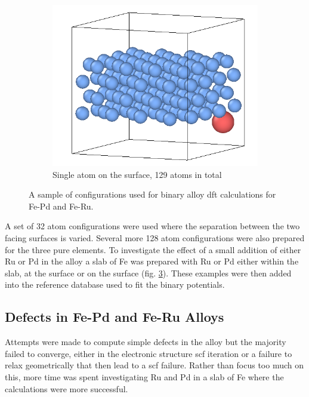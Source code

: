 \begin{figure}[htb]
\begin{subfigure}{.32\textwidth}
  \label{fig:sub-first}
\end{subfigure}
\begin{subfigure}{.32\textwidth}
  \centering
  \includegraphics[width=.94\linewidth]{chapters/potentials_fe_pd_ru/slabs/slab03.png}  
  \caption{Single atom on the surface, 129 atoms in total}
  \label{fig:sub-first}
\end{subfigure}
\caption{A sample of configurations used for binary alloy \acrshort{dft} calculations for Fe-Pd and Fe-Ru.}
\label{fig:binaryalloyconfigurationsslab}
\end{figure}

A set of 32 atom configurations were used where the separation between the two facing surfaces is varied.  Several more 128 atom configurations were also prepared for the three pure elements.  To investigate the effect of a small addition of either Ru or Pd in the alloy a slab of Fe was prepared with Ru or Pd either within the slab, at the surface or on the surface (fig. \ref{fig:binaryalloyconfigurationsslab}).  These examples were then added into the reference database used to fit the binary potentials.



\FloatBarrier
\subsection{Defects in Fe-Pd and Fe-Ru Alloys}

Attempts were made to compute simple defects in the alloy but the majority failed to converge, either in the electronic structure \acrshort{scf} iteration or a failure to relax geometrically that then lead to a \acrshort{scf} failure.  Rather than focus too much on this, more time was spent investigating Ru and Pd in a slab of Fe where the calculations were more successful.




